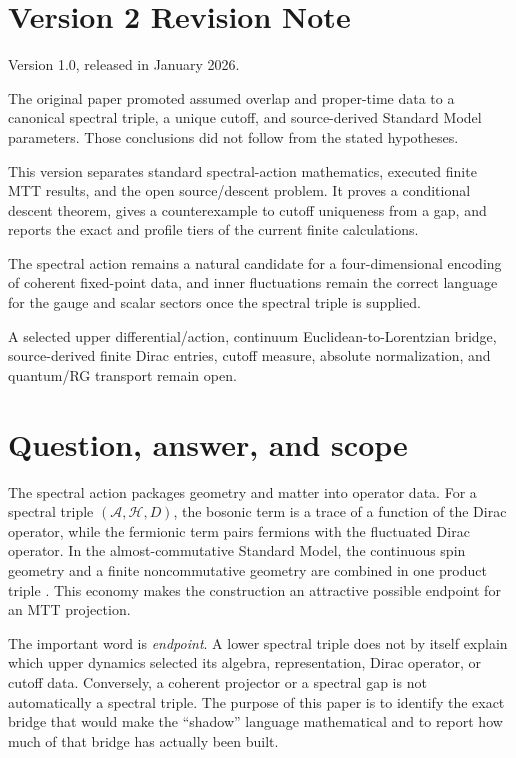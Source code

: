 \documentclass[11pt]{article}
\begin{document}
\section*{Version 2 Revision Note}
\begin{description}[leftmargin=2.8cm,style=nextline]
\item[Supersedes] Version 1.0, released in January 2026.
\item[Reason] The original paper promoted assumed overlap and proper-time data
to a canonical spectral triple, a unique cutoff, and source-derived Standard
Model parameters.  Those conclusions did not follow from the stated
hypotheses.
\item[Resolution] This version separates standard spectral-action mathematics,
executed finite MTT results, and the open source/descent problem.  It proves a
conditional descent theorem, gives a counterexample to cutoff uniqueness from
a gap, and reports the exact and profile tiers of the current finite
calculations.
\item[Retained content] The spectral action remains a natural candidate for a
four-dimensional encoding of coherent fixed-point data, and inner
fluctuations remain the correct language for the gauge and scalar sectors once
the spectral triple is supplied.
\item[Open boundary] A selected upper differential/action, continuum
Euclidean-to-Lorentzian bridge, source-derived finite Dirac entries, cutoff
measure, absolute normalization, and quantum/RG transport remain open.
\end{description}

\tableofcontents

\section{Question, answer, and scope}

The spectral action packages geometry and matter into operator data.  For a
spectral triple $(\mathcal{A},\mathcal{H},D)$, the bosonic term is a trace of a
function of the Dirac operator, while the fermionic term pairs fermions with
the fluctuated Dirac operator.  In the almost-commutative Standard Model, the
continuous spin geometry and a finite noncommutative geometry are combined in
one product triple \cite{CC1996,CCM2006}.  This economy makes the construction
an attractive possible endpoint for an MTT projection.

The important word is \emph{endpoint}.  A lower spectral triple does not by
itself explain which upper dynamics selected its algebra, representation,
Dirac operator, or cutoff data.  Conversely, a coherent projector or a
spectral gap is not automatically a spectral triple.  The purpose of this
paper is to identify the exact bridge that would make the ``shadow'' language
mathematical and to report how much of that bridge has actually been built.
\end{document}
